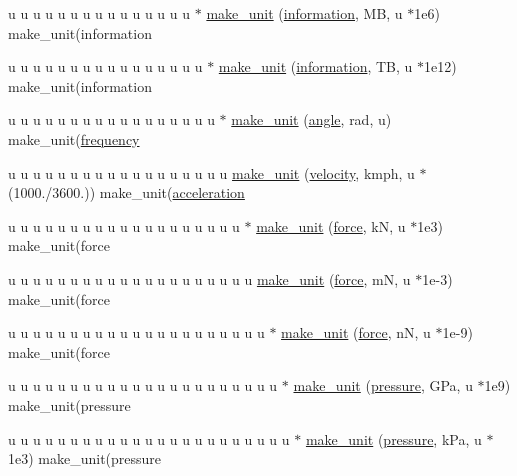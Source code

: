 \begin{DoxyCompactItemize}
\item 
u u u u u u u u u u u u u u u $\ast$ \hyperlink{namespacemui_1_1dim_ac2b7c3d91c325a48a4e6772719b3277d}{make\+\_\+unit} (\hyperlink{namespacemui_1_1dim_abee516dc27b7ef30e706ffc9ce0ea363}{information}, MB, u $\ast$1e6) make\+\_\+unit(information
\item 
u u u u u u u u u u u u u u u u $\ast$ \hyperlink{namespacemui_1_1dim_abe710ea9ab7c35485528c4d051d7fd11}{make\+\_\+unit} (\hyperlink{namespacemui_1_1dim_abee516dc27b7ef30e706ffc9ce0ea363}{information}, TB, u $\ast$1e12) make\+\_\+unit(information
\item 
u u u u u u u u u u u u u u u u u $\ast$ \hyperlink{namespacemui_1_1dim_a4a65bae6ab0b0f920231fdc303b4f07a}{make\+\_\+unit} (\hyperlink{namespacemui_1_1dim_a967db7ab1d1127cdb94fe084e592d1e0}{angle}, rad, u) make\+\_\+unit(\hyperlink{namespacemui_1_1dim_a2b1533b4a87cb5275032e7279211e793}{frequency}
\item 
u u u u u u u u u u u u u u u u u u \hyperlink{namespacemui_1_1dim_a1e2546f00c48ea57ce4f21f4a087c2fd}{make\+\_\+unit} (\hyperlink{namespacemui_1_1dim_a2ed9711eaaf9db79861b69ffa35d277d}{velocity}, kmph, u $\ast$(1000./3600.)) make\+\_\+unit(\hyperlink{namespacemui_1_1dim_aec150f5d30ea4484d99cbfaf1d6f80c9}{acceleration}
\item 
u u u u u u u u u u u u u u u u u u u $\ast$ \hyperlink{namespacemui_1_1dim_a1b99b1ca29bdab431726c72c63fcc7de}{make\+\_\+unit} (\hyperlink{namespacemui_1_1dim_a68ab4d0da68b3ea4bf71656c271fa4a0}{force}, kN, u $\ast$1e3) make\+\_\+unit(force
\item 
u u u u u u u u u u u u u u u u u u u u \hyperlink{namespacemui_1_1dim_a6c2e559fd6874cc7ba1ac72c9a08dc7c}{make\+\_\+unit} (\hyperlink{namespacemui_1_1dim_a68ab4d0da68b3ea4bf71656c271fa4a0}{force}, mN, u $\ast$1e-\/3) make\+\_\+unit(force
\item 
u u u u u u u u u u u u u u u u u u u u u $\ast$ \hyperlink{namespacemui_1_1dim_a42baec722b3338d085f2694ede14fffb}{make\+\_\+unit} (\hyperlink{namespacemui_1_1dim_a68ab4d0da68b3ea4bf71656c271fa4a0}{force}, nN, u $\ast$1e-\/9) make\+\_\+unit(force
\item 
u u u u u u u u u u u u u u u u u u u u u u $\ast$ \hyperlink{namespacemui_1_1dim_a2db8f72445b0d190f2616b5cb1fe5d9f}{make\+\_\+unit} (\hyperlink{namespacemui_1_1dim_a736ee7f1a80106425f8555b26b56e84d}{pressure}, G\+Pa, u $\ast$1e9) make\+\_\+unit(pressure
\item 
u u u u u u u u u u u u u u u u u u u u u u u $\ast$ \hyperlink{namespacemui_1_1dim_a62daef59afd250539e8ee2595bdf7ce3}{make\+\_\+unit} (\hyperlink{namespacemui_1_1dim_a736ee7f1a80106425f8555b26b56e84d}{pressure}, k\+Pa, u $\ast$1e3) make\+\_\+unit(pressure

\end{DoxyCompactItemize}
